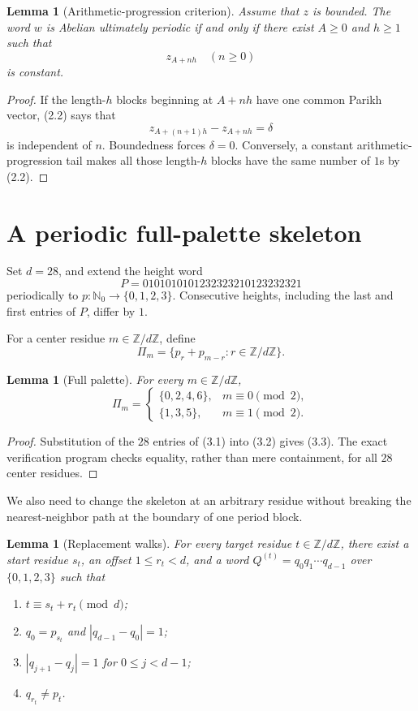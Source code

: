 \documentclass[11pt]{article}
\newtheorem{lemma}[theorem]{Lemma}
\newcommand{\N}{\mathbb N}
\begin{document}
\begin{lemma}[Arithmetic-progression criterion]\label{lem:ap}
Assume that $z$ is bounded. The word $w$ is Abelian ultimately periodic if
and only if there exist $A\ge0$ and $h\ge1$ such that
\[
z_{A+nh}\quad(n\ge0)
\]
is constant.
\end{lemma}

\begin{proof}
If the length-$h$ blocks beginning at $A+nh$ have one common Parikh vector,
(2.2) says that
\[
z_{A+(n+1)h}-z_{A+nh}=\delta
\]
is independent of $n$. Boundedness forces $\delta=0$. Conversely, a constant
arithmetic-progression tail makes all those length-$h$ blocks have the same
number of $1$s by (2.2).
\end{proof}

\section{A periodic full-palette skeleton}

Set $d=28$, and extend the height word
\[
P=0101010101232323210123232321 \tag{3.1}
\]
periodically to $p\colon\N_0\to\{0,1,2,3\}$. Consecutive heights, including
the last and first entries of $P$, differ by $1$.

For a center residue $m\in\mathbb Z/d\mathbb Z$, define
\[
\Pi_m=\{p_r+p_{m-r}:r\in\mathbb Z/d\mathbb Z\}. \tag{3.2}
\]

\begin{lemma}[Full palette]\label{lem:palette}
For every $m\in\mathbb Z/d\mathbb Z$,
\[
\Pi_m=
\begin{cases}
\{0,2,4,6\},&m\equiv0\pmod2,\\
\{1,3,5\},&m\equiv1\pmod2.
\end{cases} \tag{3.3}
\]
\end{lemma}

\begin{proof}
Substitution of the $28$ entries of (3.1) into (3.2) gives (3.3). The exact
verification program checks equality, rather than mere containment, for all
$28$ center residues.
\end{proof}

We also need to change the skeleton at an arbitrary residue without breaking
the nearest-neighbor path at the boundary of one period block.

\begin{lemma}[Replacement walks]\label{lem:replacement}
For every target residue $t\in\mathbb Z/d\mathbb Z$, there exist a start
residue $s_t$, an offset $1\le r_t<d$, and a word
$Q^{(t)}=q_0q_1\cdots q_{d-1}$ over $\{0,1,2,3\}$ such that
\begin{enumerate}
\item $t\equiv s_t+r_t\pmod d$;
\item $q_0=p_{s_t}$ and $|q_{d-1}-q_0|=1$;
\item $|q_{j+1}-q_j|=1$ for $0\le j<d-1$;
\item $q_{r_t}\ne p_t$.
\end{enumerate}
\end{lemma}
\end{document}
